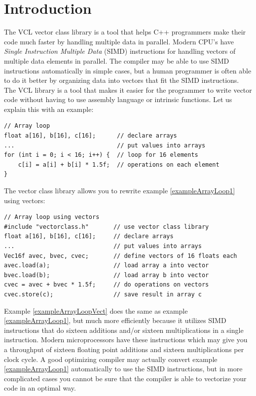 \documentclass[vcl_manual.tex]{subfiles}
\begin{document}
\chapter{Introduction}\label{chap:Introduction}
\flushleft
The VCL vector class library is a tool that helps C++ programmers make their code much faster by handling multiple data in parallel. Modern CPU’s have \textit{Single Instruction Multiple Data} (SIMD) instructions for handling vectors of multiple data elements in parallel. The compiler may be able to use SIMD instructions automatically in simple cases, but a human programmer is often able to do it better by organizing data into vectors that fit the SIMD instructions. The VCL library is a tool that makes it easier for the programmer to write vector code without having to use assembly language or intrinsic functions. Let us explain this with an example:

\begin{example}
\label{exampleArrayLoop1}
\end{example} %
\begin{lstlisting}[frame=single]
// Array loop
float a[16], b[16], c[16];      // declare arrays
...                             // put values into arrays
for (int i = 0; i < 16; i++) {  // loop for 16 elements
    c[i] = a[i] + b[i] * 1.5f;  // operations on each element
}
\end{lstlisting}

The vector class library allows you to rewrite example \ref{exampleArrayLoop1} using vectors:

\begin{example}
\label{exampleArrayLoopVect}
\end{example}
\begin{lstlisting}[frame=single]
// Array loop using vectors
#include "vectorclass.h"       // use vector class library
float a[16], b[16], c[16];     // declare arrays
...                            // put values into arrays
Vec16f avec, bvec, cvec;       // define vectors of 16 floats each
avec.load(a);                  // load array a into vector
bvec.load(b);                  // load array b into vector
cvec = avec + bvec * 1.5f;     // do operations on vectors
cvec.store(c);                 // save result in array c
\end{lstlisting}

Example \ref{exampleArrayLoopVect} does the same as example \ref{exampleArrayLoop1}, but much more efficiently because it utilizes SIMD instructions that do sixteen additions and/or sixteen multiplications in a single instruction. Modern microprocessors have these instructions which may give you a throughput of sixteen floating point additions and sixteen multiplications per clock cycle. A good optimizing compiler may actually convert example \ref{exampleArrayLoop1} automatically to use the SIMD instructions, but in more complicated cases you cannot be sure that the compiler is able to vectorize your code in an optimal way.
\end{document}
